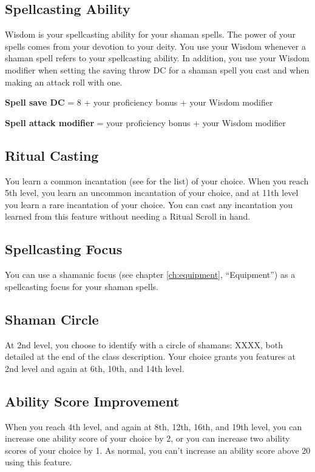 \subsection{Spellcasting Ability}

Wisdom is your spellcasting ability for your shaman spells. The power of your spells comes from your devotion to your deity. You use your Wisdom whenever a shaman spell refers to your spellcasting ability. In addition, you use your Wisdom modifier when setting the saving throw DC for a shaman spell you cast and when making an attack roll with one.

\textbf{Spell save DC} = 8 + your proficiency bonus + your Wisdom modifier

\textbf{Spell attack modifier} = your proficiency bonus + your Wisdom modifier

\subsection{Ritual Casting}

You learn a common incantation (see  for the list) of your choice. When you reach 5th level, you learn an uncommon incantation of your choice, and at 11th level you learn a rare incantation of your choice. You can cast any incantation you learned from this feature without needing a Ritual Scroll in hand.

\subsection{Spellcasting Focus}

You can use a shamanic focus (see chapter \ref{ch:equipment}, “Equipment”) as a spellcasting focus for your shaman spells.

\subsection{Shaman Circle}

At 2nd level, you choose to identify with a circle of shamans: XXXX, both detailed at the end of the class description. Your choice grants you features at 2nd level and again at 6th, 10th, and 14th level.

\subsection{Ability Score Improvement}

When you reach 4th level, and again at 8th, 12th, 16th, and 19th level, you can increase one ability score of your choice by 2, or you can increase two ability scores of your choice by 1. As normal, you can't increase an ability score above 20 using this feature.

